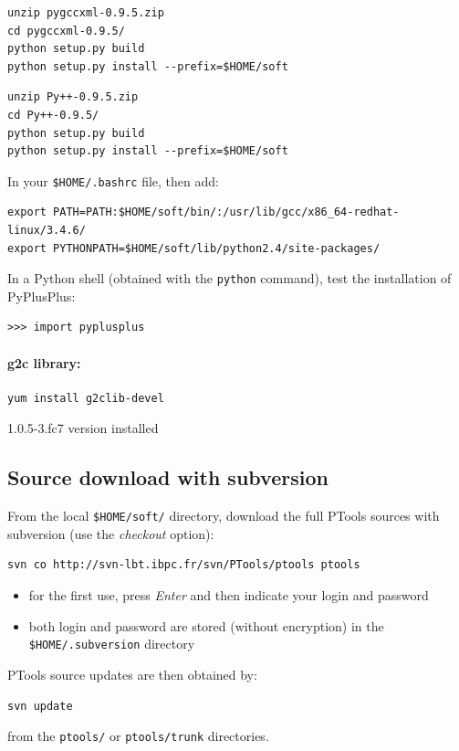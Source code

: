 \documentclass[12pt,a4paper]{article}
\begin{document}
\begin{verbatim}
unzip pygccxml-0.9.5.zip
cd pygccxml-0.9.5/
python setup.py build
python setup.py install --prefix=$HOME/soft
\end{verbatim}

\begin{verbatim}
unzip Py++-0.9.5.zip 
cd Py++-0.9.5/
python setup.py build
python setup.py install --prefix=$HOME/soft
\end{verbatim}

In your {\tt \$HOME/.bashrc} file, then add:
\begin{verbatim}
export PATH=PATH:$HOME/soft/bin/:/usr/lib/gcc/x86_64-redhat-linux/3.4.6/
export PYTHONPATH=$HOME/soft/lib/python2.4/site-packages/
\end{verbatim}

In a Python shell (obtained with the {\tt python} command), test the installation
of PyPlusPlus:
\begin{verbatim}
>>> import pyplusplus
\end{verbatim}

\paragraph{g2c library: }

\begin{verbatim}
yum install g2clib-devel
\end{verbatim}
1.0.5-3.fc7 version installed


\subsection{Source download with subversion}

From the local {\tt \$HOME/soft/} directory, download the full PTools sources with subversion (use the {\it checkout} option):
\begin{verbatim}
svn co http://svn-lbt.ibpc.fr/svn/PTools/ptools ptools
\end{verbatim}

\begin{itemize}
\item for the first use, press {\it Enter} and then indicate your login and password
\item both login and password are stored (without encryption) in the {\tt \$HOME/.subversion} directory
\end{itemize}

PTools source updates are then obtained by:
\begin{verbatim}
svn update
\end{verbatim}
from the {\tt ptools/} or {\tt ptools/trunk} directories.
\end{document}
